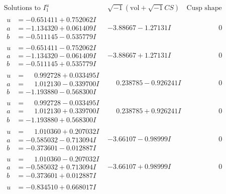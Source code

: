 \documentclass[1p]{elsarticle_modified}
\theoremstyle{definition}
\newcommand{\I}{\sqrt{-1}}
\begin{document}
$$\begin{array}{c|c|c}  
\text{Solutions to }I^u_{1}& \I (\text{vol} + \sqrt{-1}CS) & \text{Cusp shape}\\
 \hline 
\begin{aligned}
u &= -0.651411 + 0.752062 I \\
a &= -1.134320 + 0.061409 I \\
b &= -0.511145 - 0.535779 I\end{aligned}
 & -3.88667 - 1.27131 I & \phantom{-0.000000 } 0 \\ \hline\begin{aligned}
u &= -0.651411 - 0.752062 I \\
a &= -1.134320 - 0.061409 I \\
b &= -0.511145 + 0.535779 I\end{aligned}
 & -3.88667 + 1.27131 I & \phantom{-0.000000 } 0 \\ \hline\begin{aligned}
u &= \phantom{-}0.992728 + 0.033495 I \\
a &= \phantom{-}1.012130 - 0.339700 I \\
b &= -1.193880 - 0.568300 I\end{aligned}
 & \phantom{-}0.238785 - 0.926241 I & \phantom{-0.000000 } 0 \\ \hline\begin{aligned}
u &= \phantom{-}0.992728 - 0.033495 I \\
a &= \phantom{-}1.012130 + 0.339700 I \\
b &= -1.193880 + 0.568300 I\end{aligned}
 & \phantom{-}0.238785 + 0.926241 I & \phantom{-0.000000 } 0 \\ \hline\begin{aligned}
u &= \phantom{-}1.010360 + 0.207032 I \\
a &= -0.585032 - 0.713094 I \\
b &= -0.373601 - 0.012887 I\end{aligned}
 & -3.66107 - 0.98999 I & \phantom{-0.000000 } 0 \\ \hline\begin{aligned}
u &= \phantom{-}1.010360 - 0.207032 I \\
a &= -0.585032 + 0.713094 I \\
b &= -0.373601 + 0.012887 I\end{aligned}
 & -3.66107 + 0.98999 I & \phantom{-0.000000 } 0 \\ \hline\begin{aligned}
u &= -0.834510 + 0.668017 I \\

\end{aligned}
\end{array}$$
\end{document}
